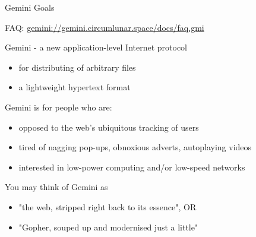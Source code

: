 \documentclass[presentation, 11pt,  aspectratio=169]{beamer}
\begin{document}
\begin{frame}[label={sec:org5c0a10f}]{Gemini Goals}
\begin{tiny}
FAQ: \href{gemini://gemini.circumlunar.space/docs/faq.gmi}{gemini://gemini.circumlunar.space/docs/faq.gmi}\\
\end{tiny}

\begin{block}{Gemini - a new application-level Internet protocol}
\begin{itemize}
\item for distributing of arbitrary files\\
\item a lightweight hypertext format\\
\end{itemize}
\end{block}

\begin{block}{Gemini is for people who are:}
\begin{itemize}
\item opposed to the web's ubiquitous tracking of users\\
\item tired of nagging pop-ups, obnoxious adverts, autoplaying videos\\
\item interested in low-power computing and/or low-speed networks\\
\end{itemize}
\pause
\end{block}
\begin{block}{You may think of Gemini as}
\begin{itemize}
\item "the web, stripped right back to its essence", OR\\
\item "Gopher, souped up and modernised just a little"\\
\end{itemize}
\end{block}
\end{frame}
\end{document}
